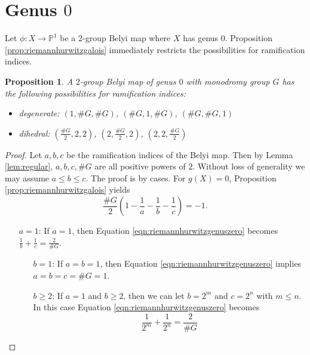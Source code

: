 \documentclass{dcthesis}
\newcommand{\PP}{\mathbb P}
\newtheorem{prop}{Proposition}[section]
\theoremstyle{definition}
\theoremstyle{remark}
\numberwithin{equation}{section}
\numberwithin{figure}{section}
\begin{document}
{  \section{Genus $0$}{\label{sec:genuszero}
    Let $\phi:X\to\PP^1$ be a $2$-group Belyi map where $X$ has genus $0$.
    Proposition \ref{prop:riemannhurwitzgalois} immediately restricts the
    possibilities for ramification indices.
    \begin{prop}\label{prop:genuszeroramification}
      A $2$-group Belyi map of genus $0$ with monodromy group $G$
      has the following possibilities for ramification indices:
      \begin{itemize}
        \item degenerate: $(1,\#G, \#G)$, $(\#G, 1, \#G)$, $(\#G, \#G, 1)$
        \item
          dihedral:
          $\left(\frac{\#G}{2}, 2, 2\right)$,
          $\left(2, \frac{\#G}{2}, 2\right)$,
          $\left(2, 2, \frac{\#G}{2}\right)$
      \end{itemize}
    \end{prop}
    \begin{proof}
      Let $a,b,c$ be the ramification indices of the Belyi map.
      Then by Lemma \ref{lem:regular},
      $a,b,c,\#G$ are all positive powers of $2$.
      Without loss of generality we may assume $a\le b\le c$.
      The proof is by cases.
      For $g(X)=0$, Proposition \ref{prop:riemannhurwitzgalois}
      yields
      \begin{equation}\label{eqn:riemannhurwitzgenuszero}
        \frac{\#G}{2}\left(1-\frac{1}{a}-\frac{1}{b}-\frac{1}{c}\right) = -1.
      \end{equation}
      \begin{itemize}
        \item[\underline{$a=1$}:]
          If $a=1$, then
          Equation \ref{eqn:riemannhurwitzgenuszero} becomes
          $\frac{1}{b}+\frac{1}{c}=\frac{2}{\#G}$.
          \begin{itemize}
            \item[\underline{$b=1$}:]
              If $a=b=1$, then
              Equation \ref{eqn:riemannhurwitzgenuszero}
              implies $a=b=c=\#G=1$.
            \item[\underline{$b\ge 2$}:]
              If $a=1$ and $b\geq 2$,
              then we can let $b=2^m$ and $c=2^n$ with $m\le n$.
              In this case
              Equation \ref{eqn:riemannhurwitzgenuszero} becomes
              \[
                \frac{1}{2^m}+\frac{1}{2^n} = \frac{2}{\#G}
\]
\end{itemize}
\end{itemize}
\end{proof}}}
\end{document}
